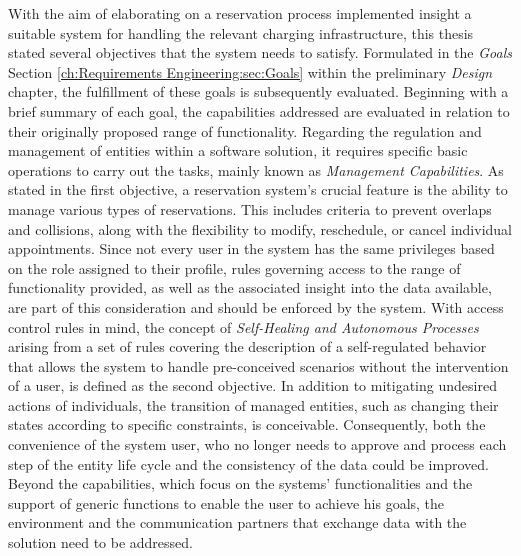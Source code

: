 With the aim of elaborating on a reservation process implemented insight a suitable system for handling the relevant charging infrastructure, this thesis stated several objectives that the system needs to satisfy. 
Formulated in the \textit{Goals} Section \ref{ch:Requirements Engineering:sec:Goals} within the preliminary \textit{Design} chapter, the fulfillment of these goals is subsequently evaluated.
Beginning with a brief summary of each goal, the capabilities addressed are evaluated in relation to their originally proposed range of functionality.
Regarding the regulation and management of entities within a software solution, it requires specific basic operations to carry out the tasks, mainly known as \textit{Management Capabilities}.
As stated in the first objective, a reservation system's crucial feature is the ability to manage various types of reservations. This includes criteria to prevent overlaps and collisions, along with the flexibility to modify, reschedule, or cancel individual appointments.
Since not every user in the system has the same privileges based on the role assigned to their profile, rules governing access to the range of functionality provided, as well as the associated insight into the data available, are part of this consideration and should be enforced by the system.
With access control rules in mind, the concept of \textit{Self-Healing and Autonomous Processes} arising from a set of rules covering the description of a self-regulated behavior that allows the system to handle pre-conceived scenarios without the intervention of a user, is defined as the second objective. 
In addition to mitigating undesired actions of individuals, the transition of managed entities, such as changing their states according to specific constraints, is conceivable.
Consequently, both the convenience of the system user, who no longer needs to approve and process each step of the entity life cycle and the consistency of the data could be improved.
Beyond the capabilities, which focus on the systems' functionalities and the support of generic functions to enable the user to achieve his goals, the environment and the communication partners that exchange data with the solution need to be addressed.
